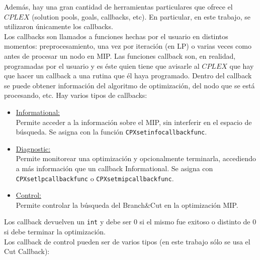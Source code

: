 Además, hay una gran cantidad de herramientas particulares que ofrece el $CPLEX$ (solution pools, goals, callbacks, etc). En particular, en este trabajo, se utilizaron únicamente los callbacks.\\

Los callbacks son llamados a funciones hechas por el usuario en distintos momentos: preprocesamiento, una vez por iteración (en LP) o varias veces como antes de procesar un nodo en MIP. Las funciones callback son, en realidad, programadas por el usuario y es éste quien tiene que avisarle al $CPLEX$ que hay que hacer un callback a una rutina que él haya programado. Dentro del callback se puede obtener información del algoritmo de optimización, del nodo que se está procesando, etc. Hay varios tipos de callbacks:

\begin{itemize}
\item \underline{Informational:}\\
Permite acceder a la información sobre el MIP, sin interferir en el espacio de búsqueda. Se asigna con la función \verb_CPXsetinfocallbackfunc_.

\item \underline{Diagnostic:}\\
Permite monitorear una optimización y opcionalmente terminarla, accediendo a más información que un callback Informational. Se asigna con \verb_CPXsetlpcallbackfunc_ o \verb_CPXsetmipcallbackfunc_.

\item \underline{Control:}\\
Permite controlar la búsqueda del Branch\&Cut en la optimización MIP.
\end{itemize}

Los callback devuelven un \verb_int_ y debe ser 0 si el mismo fue exitoso o distinto de 0 si debe terminar la optimización.\\

Los callback de control pueden ser de varios tipos (en este trabajo sólo se usa el Cut Callback):

